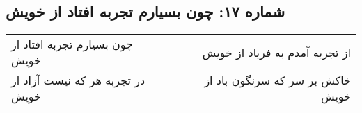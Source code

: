 \begin{center}
\section*{شماره ۱۷: چون بسیارم تجربه افتاد از خویش}
\label{sec:017}
\begin{longtable}{l p{0.5cm} r}
چون بسیارم تجربه افتاد از خویش
&&
از تجربه آمدم به فریاد از خویش
\\
در تجربه هر که نیست آزاد از خویش
&&
خاکش بر سر که سرنگون باد از خویش
\\
\end{longtable}
\end{center}
